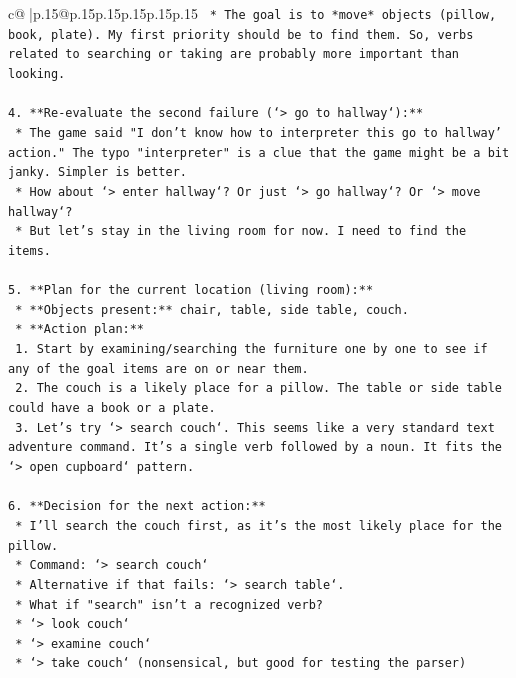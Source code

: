 \documentclass{article}
\begin{document}
{\begin{supertabular}{c@{$\;$}|p{.15\linewidth}@{}p{.15\linewidth}p{.15\linewidth}p{.15\linewidth}p{.15\linewidth}p{.15\linewidth}}
{{{\texttt{    *   The goal is to *move* objects (pillow, book, plate). My first priority should be to find them. So, verbs related to searching or taking are probably more important than looking.} \\
\\ 
\texttt{4.  **Re{-}evaluate the second failure (`> go to hallway`):**} \\
\texttt{    *   The game said "I don't know how to interpreter this go to hallway' action." The typo "interpreter" is a clue that the game might be a bit janky. Simpler is better.} \\
\texttt{    *   How about `> enter hallway`? Or just `> go hallway`? Or `> move hallway`?} \\
\texttt{    *   But let's stay in the living room for now. I need to find the items.} \\
\\ 
\texttt{5.  **Plan for the current location (living room):**} \\
\texttt{    *   **Objects present:** chair, table, side table, couch.} \\
\texttt{    *   **Action plan:**} \\
\texttt{        1.  Start by examining/searching the furniture one by one to see if any of the goal items are on or near them.} \\
\texttt{        2.  The couch is a likely place for a pillow. The table or side table could have a book or a plate.} \\
\texttt{        3.  Let's try `> search couch`. This seems like a very standard text adventure command. It's a single verb followed by a noun. It fits the `> open cupboard` pattern.} \\
\\ 
\texttt{6.  **Decision for the next action:**} \\
\texttt{    *   I'll search the couch first, as it's the most likely place for the pillow.} \\
\texttt{    *   Command: `> search couch`} \\
\texttt{    *   Alternative if that fails: `> search table`.} \\
\texttt{    *   What if "search" isn't a recognized verb?} \\
\texttt{        *   `> look couch`} \\
\texttt{        *   `> examine couch`} \\
\texttt{        *   `> take couch` (nonsensical, but good for testing the parser)} \\
}}}
\end{supertabular}}
\end{document}
